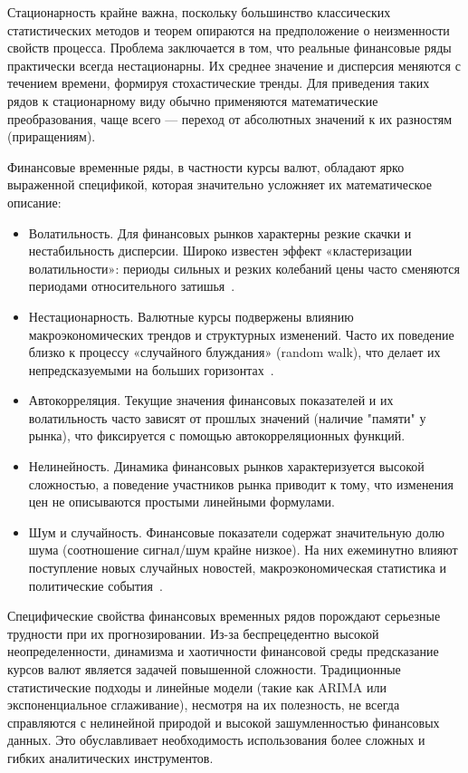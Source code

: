 Стационарность крайне важна, поскольку большинство классических статистических методов и теорем опираются на предположение о неизменности свойств процесса. Проблема заключается в том, что реальные финансовые ряды практически всегда нестационарны. Их среднее значение и дисперсия меняются с течением времени, формируя стохастические тренды. Для приведения таких рядов к стационарному виду обычно применяются математические преобразования, чаще всего — переход от абсолютных значений к их разностям (приращениям).

Финансовые временные ряды, в частности курсы валют, обладают ярко выраженной спецификой, которая значительно усложняет их математическое описание:
\begin{itemize}
    \item Волатильность. Для финансовых рынков характерны резкие скачки и нестабильность дисперсии. Широко известен эффект «кластеризации волатильности»: периоды сильных и резких колебаний цены часто сменяются периодами относительного затишья~\cite{tsay2005, alexander2008}.
    \item Нестационарность. Валютные курсы подвержены влиянию макроэкономических трендов и структурных изменений. Часто их поведение близко к процессу «случайного блуждания» (random walk), что делает их непредсказуемыми на больших горизонтах~\cite{campbell1997}.
    \item Автокорреляция. Текущие значения финансовых показателей и их волатильность часто зависят от прошлых значений (наличие "памяти" у рынка), что фиксируется с помощью автокорреляционных функций.
    \item Нелинейность. Динамика финансовых рынков характеризуется высокой сложностью, а поведение участников рынка приводит к тому, что изменения цен не описываются простыми линейными формулами.
    \item Шум и случайность. Финансовые показатели содержат значительную долю шума (соотношение сигнал/шум крайне низкое). На них ежеминутно влияют поступление новых случайных новостей, макроэкономическая статистика и политические события~\cite{alexander2008v2}.
\end{itemize} 

Специфические свойства финансовых временных рядов порождают серьезные трудности при их прогнозировании. Из-за беспрецедентно высокой неопределенности, динамизма и хаотичности финансовой среды предсказание курсов валют является задачей повышенной сложности. Традиционные статистические подходы и линейные модели (такие как ARIMA или экспоненциальное сглаживание), несмотря на их полезность, не всегда справляются с нелинейной природой и высокой зашумленностью финансовых данных. Это обуславливает необходимость использования более сложных и гибких аналитических инструментов.

